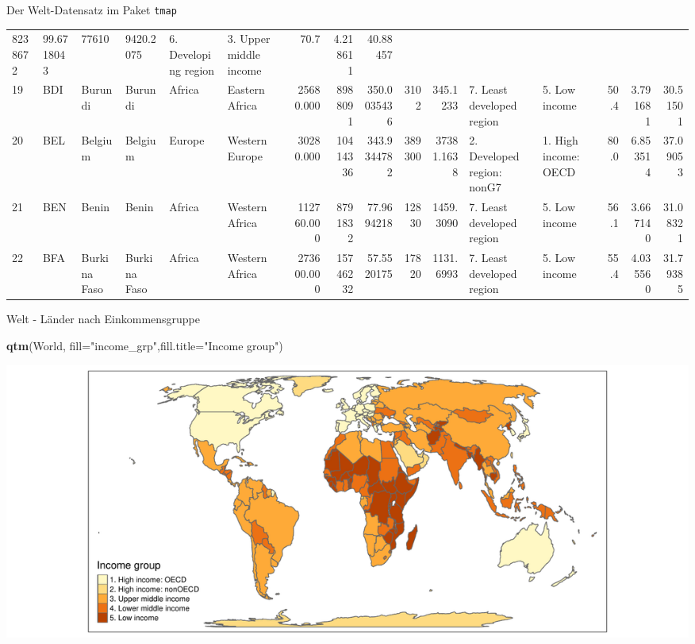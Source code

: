\documentclass[ignorenonframetext,]{beamer}
\newenvironment{Shaded}{\begin{snugshade}}{\end{snugshade}}
\newcommand{\KeywordTok}[1]{\textcolor[rgb]{0.13,0.29,0.53}{\textbf{#1}}}
\newcommand{\DataTypeTok}[1]{\textcolor[rgb]{0.13,0.29,0.53}{#1}}
\newcommand{\StringTok}[1]{\textcolor[rgb]{0.31,0.60,0.02}{#1}}
\newcommand{\NormalTok}[1]{#1}
\begin{document}
\begin{frame}{Der Welt-Datensatz im Paket \texttt{tmap}}
\begin{longtable}[]{@{}llllllrrrrrllrrr@{}}
8238672 & 99.6718043 & 77610 & 9420.2075 & 6. Developing region & 3.
Upper middle income & 70.7 & 4.218611 & 40.88457\tabularnewline
19 & BDI & Burundi & Burundi & Africa & Eastern Africa & 25680.000 &
8988091 & 350.0035436 & 3102 & 345.1233 & 7. Least developed region & 5.
Low income & 50.4 & 3.791681 & 30.51501\tabularnewline
20 & BEL & Belgium & Belgium & Europe & Western Europe & 30280.000 &
10414336 & 343.9344782 & 389300 & 37381.1638 & 2. Developed region:
nonG7 & 1. High income: OECD & 80.0 & 6.853514 & 37.09053\tabularnewline
21 & BEN & Benin & Benin & Africa & Western Africa & 112760.000 &
8791832 & 77.9694218 & 12830 & 1459.3090 & 7. Least developed region &
5. Low income & 56.1 & 3.667140 & 31.08321\tabularnewline
22 & BFA & Burkina Faso & Burkina Faso & Africa & Western Africa &
273600.000 & 15746232 & 57.5520175 & 17820 & 1131.6993 & 7. Least
developed region & 5. Low income & 55.4 & 4.035560 &
31.79385\tabularnewline
\bottomrule
\end{longtable}

\end{frame}

\begin{frame}[fragile]{Welt - Länder nach Einkommensgruppe}

\begin{Shaded}
\begin{Highlighting}[]
\KeywordTok{qtm}\NormalTok{(World, }\DataTypeTok{fill=}\StringTok{"income_grp"}\NormalTok{,}\DataTypeTok{fill.title=}\StringTok{"Income group"}\NormalTok{) }
\end{Highlighting}
\end{Shaded}

\includegraphics{slides_all2gether_part1_files/figure-beamer/unnamed-chunk-65-1.pdf}

\end{frame}
\end{document}
